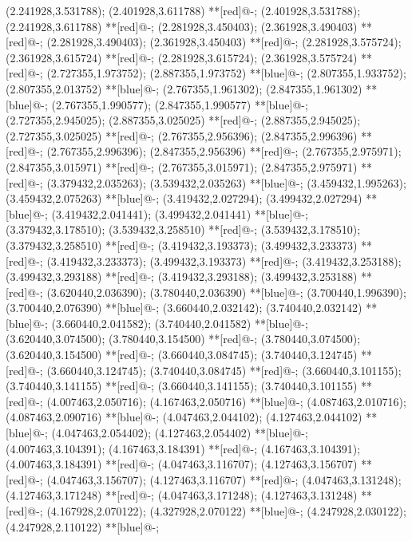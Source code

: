 (2.241928,3.531788); (2.401928,3.611788) **[red]@{-};
(2.401928,3.531788); (2.241928,3.611788) **[red]@{-};
(2.281928,3.450403); (2.361928,3.490403) **[red]@{-};
(2.281928,3.490403); (2.361928,3.450403) **[red]@{-};
(2.281928,3.575724); (2.361928,3.615724) **[red]@{-};
(2.281928,3.615724); (2.361928,3.575724) **[red]@{-};
(2.727355,1.973752); (2.887355,1.973752) **[blue]@{-};
(2.807355,1.933752); (2.807355,2.013752) **[blue]@{-};
(2.767355,1.961302); (2.847355,1.961302) **[blue]@{-};
(2.767355,1.990577); (2.847355,1.990577) **[blue]@{-};
(2.727355,2.945025); (2.887355,3.025025) **[red]@{-};
(2.887355,2.945025); (2.727355,3.025025) **[red]@{-};
(2.767355,2.956396); (2.847355,2.996396) **[red]@{-};
(2.767355,2.996396); (2.847355,2.956396) **[red]@{-};
(2.767355,2.975971); (2.847355,3.015971) **[red]@{-};
(2.767355,3.015971); (2.847355,2.975971) **[red]@{-};
(3.379432,2.035263); (3.539432,2.035263) **[blue]@{-};
(3.459432,1.995263); (3.459432,2.075263) **[blue]@{-};
(3.419432,2.027294); (3.499432,2.027294) **[blue]@{-};
(3.419432,2.041441); (3.499432,2.041441) **[blue]@{-};
(3.379432,3.178510); (3.539432,3.258510) **[red]@{-};
(3.539432,3.178510); (3.379432,3.258510) **[red]@{-};
(3.419432,3.193373); (3.499432,3.233373) **[red]@{-};
(3.419432,3.233373); (3.499432,3.193373) **[red]@{-};
(3.419432,3.253188); (3.499432,3.293188) **[red]@{-};
(3.419432,3.293188); (3.499432,3.253188) **[red]@{-};
(3.620440,2.036390); (3.780440,2.036390) **[blue]@{-};
(3.700440,1.996390); (3.700440,2.076390) **[blue]@{-};
(3.660440,2.032142); (3.740440,2.032142) **[blue]@{-};
(3.660440,2.041582); (3.740440,2.041582) **[blue]@{-};
(3.620440,3.074500); (3.780440,3.154500) **[red]@{-};
(3.780440,3.074500); (3.620440,3.154500) **[red]@{-};
(3.660440,3.084745); (3.740440,3.124745) **[red]@{-};
(3.660440,3.124745); (3.740440,3.084745) **[red]@{-};
(3.660440,3.101155); (3.740440,3.141155) **[red]@{-};
(3.660440,3.141155); (3.740440,3.101155) **[red]@{-};
(4.007463,2.050716); (4.167463,2.050716) **[blue]@{-};
(4.087463,2.010716); (4.087463,2.090716) **[blue]@{-};
(4.047463,2.044102); (4.127463,2.044102) **[blue]@{-};
(4.047463,2.054402); (4.127463,2.054402) **[blue]@{-};
(4.007463,3.104391); (4.167463,3.184391) **[red]@{-};
(4.167463,3.104391); (4.007463,3.184391) **[red]@{-};
(4.047463,3.116707); (4.127463,3.156707) **[red]@{-};
(4.047463,3.156707); (4.127463,3.116707) **[red]@{-};
(4.047463,3.131248); (4.127463,3.171248) **[red]@{-};
(4.047463,3.171248); (4.127463,3.131248) **[red]@{-};
(4.167928,2.070122); (4.327928,2.070122) **[blue]@{-};
(4.247928,2.030122); (4.247928,2.110122) **[blue]@{-};
